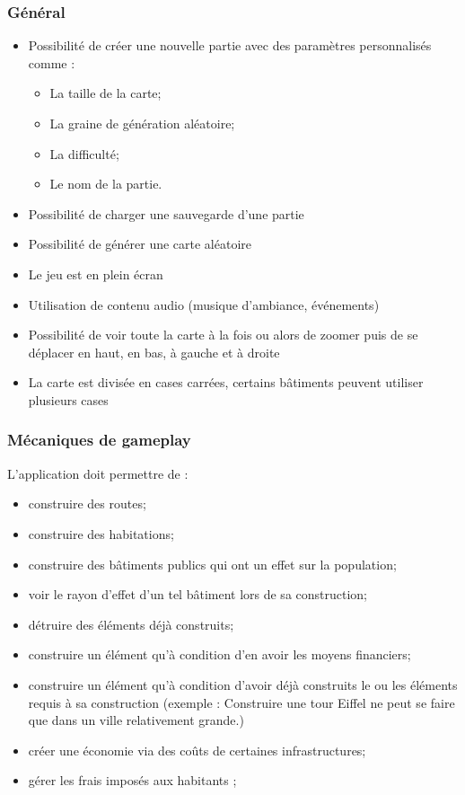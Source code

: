 \documentclass[a4paper,10pt,openany,oneside]{report}
\begin{document}
\subsubsection{Général}
\begin{itemize}
\item Possibilité de créer une nouvelle partie avec des paramètres personnalisés comme :
\begin{itemize}
\item La taille de la carte;
\item La graine de génération aléatoire;
\item La difficulté;
\item Le nom de la partie.
\end{itemize}
\item Possibilité de charger une sauvegarde d'une partie
\item Possibilité de générer une carte aléatoire
\item Le jeu est en plein écran
\item Utilisation de contenu audio (musique d'ambiance, événements)
\item Possibilité de voir toute la carte à la fois ou alors de zoomer puis de se déplacer en haut, en bas, à gauche et à droite
\item La carte est divisée en cases carrées, certains bâtiments peuvent utiliser plusieurs cases
\end{itemize}
\subsubsection{Mécaniques de gameplay}
L'application doit permettre de :
\begin{itemize}
\item construire des routes;
\item construire des habitations;
\item construire des bâtiments publics qui ont un effet sur la population;
\item voir le rayon d'effet d'un tel bâtiment lors de sa construction;
\item détruire des éléments déjà construits;
\item construire un élément qu'à condition d'en avoir les moyens financiers;
\item construire un élément qu'à condition d'avoir déjà construits le ou les éléments requis à sa construction (exemple : Construire une tour Eiffel ne peut se faire que dans un ville relativement grande.)
\item créer une économie via des coûts de certaines infrastructures;
\item gérer les frais imposés aux habitants ;
\end{itemize}
\end{document}
